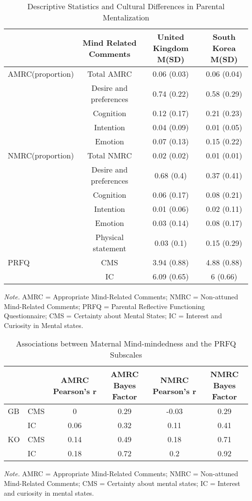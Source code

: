 \documentclass[
]{article}
\begin{document}
\begin{table}[H]

\caption{\label{tab:table2}Descriptive Statistics and Cultural Differences in Parental Mentalization}
\centering
\begin{tabular}[t]{lccc}
\toprule
\textbf{ } & \textbf{Mind Related Comments} & \textbf{United Kingdom M(SD)} & \textbf{South Korea M(SD)}\\
\midrule
AMRC(proportion) & Total AMRC & 0.06 (0.03) & 0.06 (0.04)\\
 & Desire and preferences & 0.74 (0.22) & 0.58 (0.29)\\
 & Cognition & 0.12 (0.17) & 0.21 (0.23)\\
 & Intention & 0.04 (0.09) & 0.01 (0.05)\\
 & Emotion & 0.07 (0.13) & 0.15 (0.22)\\
\addlinespace
NMRC(proportion) & Total NMRC & 0.02 (0.02) & 0.01 (0.01)\\
 & Desire and preferences & 0.68 (0.4) & 0.37 (0.41)\\
 & Cognition & 0.06 (0.17) & 0.08 (0.21)\\
 & Intention & 0.01 (0.06) & 0.02 (0.11)\\
 & Emotion & 0.03 (0.14) & 0.08 (0.17)\\
\addlinespace
 & Physical statement & 0.03 (0.1) & 0.15 (0.29)\\
PRFQ & CMS & 3.94 (0.88) & 4.88 (0.88)\\
 & IC & 6.09 (0.65) & 6 (0.66)\\
\bottomrule
\end{tabular}
\end{table}

\emph{Note.} AMRC = Appropriate Mind-Related Comments; NMRC = Non-attuned Mind-Related Comments; PRFQ = Parental Reflective Functioning Questionnaire; CMS = Certainty about Mental States; IC = Interest and Curiosity in Mental states.

\newpage

\begin{table}[H]

\caption{\label{tab:Table3prep}Associations between Maternal Mind-mindedness and the PRFQ Subscales}
\centering
\fontsize{9}{11}\selectfont
\begin{tabular}[t]{llcccc}
\toprule
\textbf{ } & \textbf{  } & \textbf{AMRC Pearson's r} & \textbf{AMRC Bayes Factor} & \textbf{NMRC Pearson's r} & \textbf{NMRC Bayes Factor}\\
\midrule
GB & CMS & 0 & 0.29 & -0.03 & 0.29\\
 & IC & 0.06 & 0.32 & 0.11 & 0.41\\
KO & CMS & 0.14 & 0.49 & 0.18 & 0.71\\
 & IC & 0.18 & 0.72 & 0.2 & 0.92\\
\bottomrule
\end{tabular}
\end{table}

\emph{Note.} AMRC = Appropriate Mind-Related Comments; NMRC = Non-attuned Mind-Related Comments; CMS = Certainty about mental states; IC = Interest and curiosity in mental states.
\end{document}
